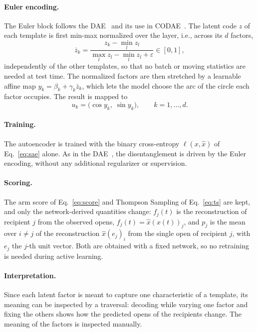 \documentclass[sigconf]{acmart}
\begin{document}
\paragraph{Euler encoding.} The Euler block follows the DAE~\cite{cha2023orthogonality}
and its use in CODAE~\cite{cha2025discovering}. The latent code $z$ of each
template is first min-max normalized over the layer, i.e., across its $d$
factors,
\begin{equation}\label{eq:layernorm}
  \bar{z}_k = \frac{z_k - \min_{l} z_l}{\max_{l} z_l - \min_{l} z_l + \varepsilon}
  \in [0,1],
\end{equation}
independently of the other templates, so that no batch or moving statistics are
needed at test time. The normalized factors are then stretched by a learnable
affine map $y_k = \beta_k + \gamma_k \bar{z}_k$, which lets the model choose the
arc of the circle each factor occupies. The result is mapped to
\begin{equation}\label{eq:euler}
  u_k = \bigl(\cos y_k,\; \sin y_k\bigr), \qquad k = 1, \dots, d.
\end{equation}

\paragraph{Training.} The autoencoder is trained with the binary cross-entropy
$\ell(x, \hat{x})$ of Eq.~\eqref{eq:sae} alone. As in the
DAE~\cite{cha2023orthogonality}, the disentanglement is driven by the Euler
encoding, without any additional regularizer or supervision.

\paragraph{Scoring.} The arm score of Eq.~\eqref{eq:score} and Thompson Sampling
of Eq.~\eqref{eq:ts} are kept, and only the network-derived quantities change:
$f_j(t)$ is the reconstruction of recipient $j$ from the observed opens,
$f_j(t) = \hat{x}(x(t))_j$, and $p_j$ is the mean over $i \neq j$ of the
reconstruction $\hat{x}(e_j)_i$ from the single open of recipient $j$, with $e_j$
the $j$-th unit vector. Both are obtained with a fixed network, so no retraining
is needed during active learning.

\paragraph{Interpretation.} Since each latent factor is meant to capture one
characteristic of a template, its meaning can be inspected by a traversal:
decoding while varying one factor and fixing the others shows how the predicted
opens of the recipients change. The meaning of the factors is inspected manually.
\end{document}
